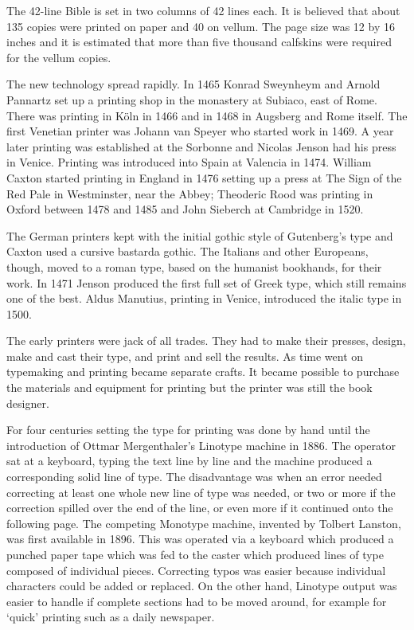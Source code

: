 \documentclass[10pt,letterpaper,extrafontsizes]{memoir}
\begin{document}
    The 42-line Bible is set in two columns of 42 lines each. It is believed
that about 135 copies were printed on paper and 40 on vellum. The page size was
12 by 16 inches and it is estimated that more than five 
thousand calfskins were required for the vellum copies.

    The new technology spread rapidly. In 1465 
Konrad Sweynheym and Arnold
Pannartz set up a printing shop in the monastery at Subiaco, east of Rome.
There was printing in K\"{o}ln in 1466 and in 1468 in Augsberg and Rome itself.
The first Venetian printer was Johann van Speyer 
who started work in 1469. A year later printing was established at the 
Sorbonne and Nicolas Jenson
had his press in Venice. Printing was introduced into Spain at Valencia 
in 1474. William Caxton started printing in England 
in 1476 setting up a press at The Sign of the Red Pale in Westminster, 
near the Abbey; Theoderic Rood was printing in 
Oxford between 1478 and 1485 and John Sieberch at 
Cambridge in 1520.

    The German printers kept with the initial gothic
style of Gutenberg's type and Caxton used a cursive bastarda gothic. The
Italians and other Europeans, though, moved to a roman type, based on the
humanist bookhands, for their
work. In 1471 Jenson produced the first full set of Greek type, which still
remains one of the best. Aldus Manutius, printing in 
Venice, introduced the italic type in 1500.

   The early printers were jack of all trades. They had to make their presses,
design, make and cast their type, 
and print and sell the results. As time went
on typemaking and printing became separate crafts. It became possible to 
purchase the materials and equipment for printing but the printer was still
the book designer.

   For four centuries setting the type for printing was done by hand until 
the introduction of Ottmar Mergenthaler's 
Linotype machine in 1886. The operator
sat at a keyboard, typing the text line by line and the machine produced a 
corresponding solid line of type. The disadvantage was when an error needed
correcting at least one whole new line of type was needed, or two or more if
the correction spilled over the end of the line, or even more if it continued
onto the following page. The competing 
Monotype machine, invented by Tolbert 
Lanston, was first available in 1896. This was operated via a keyboard which
produced a punched paper tape which was fed to the caster which produced
lines of type composed of individual pieces. Correcting typos was easier
because individual characters could be added or replaced. On the other hand,
Linotype output was easier to handle if complete sections had to be moved
around, for example for `quick' printing such as a daily newspaper. 
\end{document}
